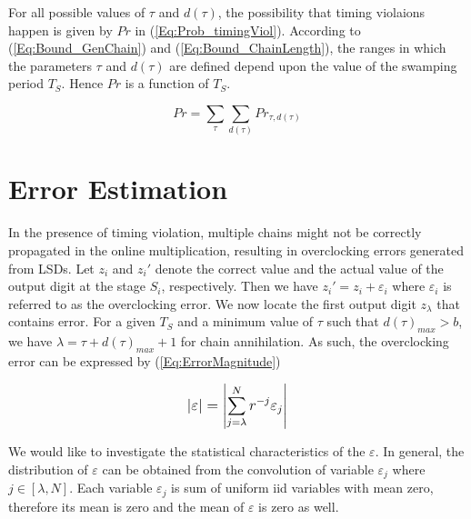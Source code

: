 \documentclass[journal]{IEEEtran}
\begin{document}
For all possible values of $\tau$ and $d(\tau)$, the possibility that timing violaions happen is given by $Pr$ in (\ref{Eq:Prob_timingViol}). According to (\ref{Eq:Bound_GenChain}) and (\ref{Eq:Bound_ChainLength}), the ranges in which the parameters $\tau$ and $d(\tau)$ are defined depend upon the value of the swamping period $T_S$. Hence $Pr$ is a function of $T_S$.

\begin{equation}\label{Eq:Prob_timingViol}
Pr= \sum_\tau \sum_{d(\tau)} Pr_{\tau,d(\tau )}
\end{equation}


\section{Error Estimation}

In the presence of timing violation, multiple chains might not be correctly propagated in the online multiplication, resulting in overclocking errors generated from LSDs. Let $z_i$ and ${z_i}'$ denote the correct value and the actual value of the output digit at the stage $S_i$, respectively. Then we have ${z_i}'=z_i+\varepsilon_i$ where $\varepsilon_i$ is referred to as the overclocking error. We now locate the first output digit $z_{\lambda}$ that contains error. For a given $T_S$ and a minimum value of $\tau$ such that $d(\tau)_{max}>b$, we have $\lambda=\tau+d(\tau)_{max}+1$ for chain annihilation.
%
%
As such, the overclocking error can be expressed by (\ref{Eq:ErrorMagnitude})

%
\begin{eqnarray}\label{Eq:ErrorMagnitude}
\scriptsize
 \left| \varepsilon\right|= \left|\sum_{j=\lambda}^{N} r^{-j}\varepsilon_j\right|
\normalsize
\end{eqnarray}

We would like to investigate the statistical characteristics of the $\varepsilon$. In general, the distribution of $\varepsilon$ can be obtained from the convolution of variable $\varepsilon_j$ where $j\in[\lambda,N]$. Each variable $\varepsilon_j$ is sum of uniform iid variables with mean zero, therefore its mean is zero and the mean of $\varepsilon$ is zero as well.
\end{document}
